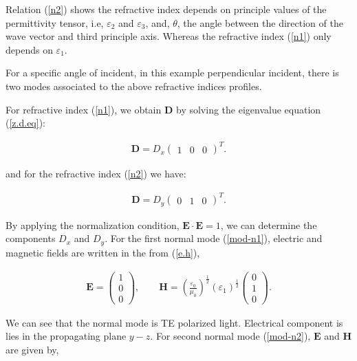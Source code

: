 \documentclass[9pt,twocolumn,twoside]{osajnl}
\begin{document}
Relation (\ref{n2}) shows the refractive index depends on principle values of the permittivity tensor, i.e, $\varepsilon_{2}$ and $\varepsilon_{3}$, and, $\theta$, the angle between  the direction of the wave vector and third principle axis. Whereas the refractive index (\ref{n1}) only depends on $\varepsilon_{1}$.

For a specific angle of incident, in this example perpendicular incident, there is two modes associated to the above refractive indices profiles. 

For refractive index (\ref{n1}), we obtain $\mathbf{D}$ by solving the eigenvalue equation (\ref{z.d.eq}):

\begin{align} \label{mod-n1}
        \mathbf{D}=D_{x}
         \begin{pmatrix}
            1 &0&0
         \end{pmatrix}^{T}.    
\end{align}

and for the refractive index (\ref{n2}) we have:

 \begin{eqnarray}\label{mod-n2}
  \mathbf{D}=D_{y}
\begin{pmatrix}
0&1&0
\end{pmatrix}^{T}.
 \end{eqnarray}
 
By applying the normalization condition, $\mathbf{E}\cdot \mathbf{E}=1$, we can determine the components $D_{x} $ and $D_{y} $. 
For the first normal mode (\ref{mod-n1}), electric and magnetic fields are written in the from (\ref{e.h}),

\begin{align}\label{field-n1}
\mathbf{E}=
         \begin{pmatrix}
             1\\0\\0
         \end{pmatrix},
        \qquad
         \mathbf{H}=\left(\frac{\varepsilon_{0}}{\mu_{0}}\right)^{\frac{1}{2}}(\varepsilon_{1})^{\frac{1}{2}}
         \begin{pmatrix}
            0\\1\\0
        \end{pmatrix}.
\end{align}

We can see that the normal mode is TE polarized light. Electrical component is lies in the propagating plane $y-z$.
 For second normal mode (\ref{mod-n2}),  $\mathbf{E}$ and $\mathbf{H}$ are given by,
\end{document}
